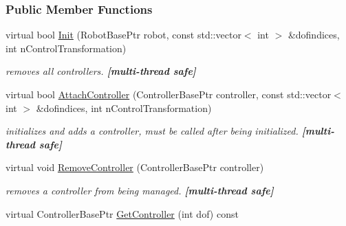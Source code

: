 \subsubsection*{Public Member Functions}
\begin{DoxyCompactItemize}
\item 
\hypertarget{classOpenRAVE_1_1MultiController_ad5666862ecbce5aee42019ec18687268}{
virtual bool \hyperlink{classOpenRAVE_1_1MultiController_ad5666862ecbce5aee42019ec18687268}{Init} (RobotBasePtr robot, const std::vector$<$ int $>$ \&dofindices, int nControlTransformation)}
\label{classOpenRAVE_1_1MultiController_ad5666862ecbce5aee42019ec18687268}

\begin{DoxyCompactList}\small\item\em removes all controllers. {\bfseries \mbox{[}multi-\/thread safe\mbox{]}} \item\end{DoxyCompactList}\item 
virtual bool \hyperlink{classOpenRAVE_1_1MultiController_a908295878cfb74d5e6ef193e2e7c6cbc}{AttachController} (ControllerBasePtr controller, const std::vector$<$ int $>$ \&dofindices, int nControlTransformation)
\begin{DoxyCompactList}\small\item\em initializes and adds a controller, must be called after being initialized. {\bfseries \mbox{[}multi-\/thread safe\mbox{]}} \item\end{DoxyCompactList}\item 
\hypertarget{classOpenRAVE_1_1MultiController_a865e2cee305a6c50e2b449d5920be590}{
virtual void \hyperlink{classOpenRAVE_1_1MultiController_a865e2cee305a6c50e2b449d5920be590}{RemoveController} (ControllerBasePtr controller)}
\label{classOpenRAVE_1_1MultiController_a865e2cee305a6c50e2b449d5920be590}

\begin{DoxyCompactList}\small\item\em removes a controller from being managed. {\bfseries \mbox{[}multi-\/thread safe\mbox{]}} \item\end{DoxyCompactList}\item 
\hypertarget{classOpenRAVE_1_1MultiController_a9c508b103e44320830142f2b450e6d5e}{
virtual ControllerBasePtr \hyperlink{classOpenRAVE_1_1MultiController_a9c508b103e44320830142f2b450e6d5e}{GetController} (int dof) const }
\label{classOpenRAVE_1_1MultiController_a9c508b103e44320830142f2b450e6d5e}


\end{DoxyCompactItemize}
